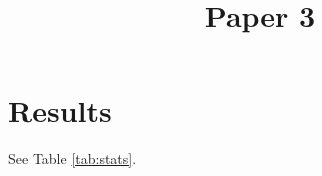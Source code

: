 \documentclass{ieeeaccess}
\begin{document}
\title{Paper 3}
\section{Results}
See Table \ref{tab:stats}.
\end{document}
